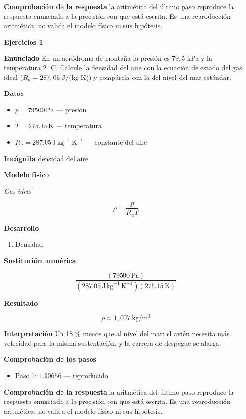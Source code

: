 \documentclass[10pt,openany]{book}
\begin{document}
\noindent\textbf{Comprobación de la respuesta} la aritmética del último paso reproduce la respuesta enunciada a la precisión con que está escrita. Es una reproducción aritmética; no valida el modelo físico ni sus hipótesis.

\noindent\textbf{Ejercicios 1}

\noindent\textbf{Enunciado}
En un aeródromo de montaña la presión es \(79{,}5\) kPa y la temperatura 2 \(^\circ\)C. Calcule la densidad del aire con la ecuación de estado del gas ideal (\(R_a = 287{,}05\) J/(kg K)) y compárela con la del nivel del mar estándar.

\noindent\textbf{Datos}
\begin{itemize}
\item $p = 79500\,\mathrm{Pa}$ — presión
\item $T = 275.15\,\mathrm{K}$ — temperatura
\item $R_{a} = 287.05\,\mathrm{J}\,\mathrm{kg}^{-1}\,\mathrm{K}^{-1}$ — constante del aire
\end{itemize}

\noindent\textbf{Incógnita}
densidad del aire

\noindent\textbf{Modelo físico}

\noindent\textit{Gas ideal}

\[
\rho = \frac{p}{R_a T}
\]

\noindent\textbf{Desarrollo}
\begin{enumerate}
\item
Densidad
\end{enumerate}

\noindent\textbf{Sustitución numérica}

\[
\frac{\left(79500\,\mathrm{Pa}\right)}{\left(287.05\,\mathrm{J}\,\mathrm{kg}^{-1}\,\mathrm{K}^{-1}\right) \left(275.15\,\mathrm{K}\right)}
\]

\noindent\textbf{Resultado}

\[
\rho \approx 1{,}007\ \mathrm{kg/m^{3}}
\]

\noindent\textbf{Interpretación}
Un 18 \% menos que al nivel del mar: el avión necesita más velocidad para la misma sustentación, y la carrera de despegue se alarga.

\noindent\textbf{Comprobación de los pasos}
\begin{itemize}
\item Paso 1: $1.00656$ — reproducido
\end{itemize}

\noindent\textbf{Comprobación de la respuesta} la aritmética del último paso reproduce la respuesta enunciada a la precisión con que está escrita. Es una reproducción aritmética; no valida el modelo físico ni sus hipótesis.
\end{document}
